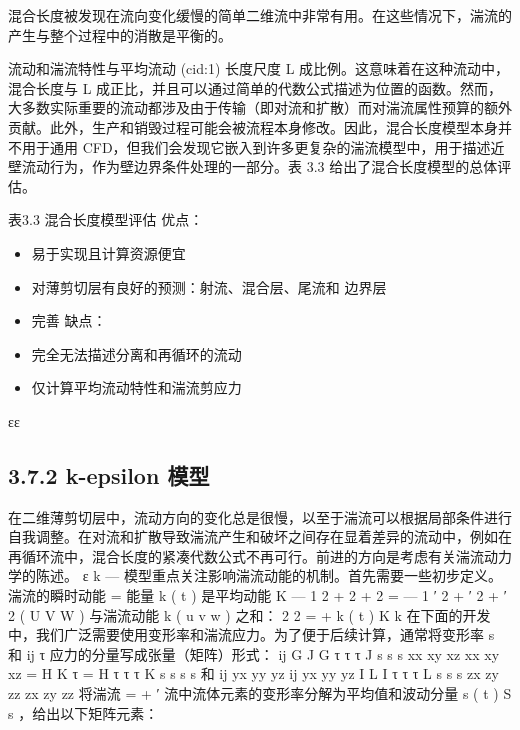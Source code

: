 \documentclass[11pt,a4paper,openany,fontset=none]{ctexbook}
\begin{document}
混合长度被发现在流向变化缓慢的简单二维流中非常有用。在这些情况下，湍流的产生与整个过程中的消散是平衡的。

流动和湍流特性与平均流动 (cid:1) 长度尺度 L 成比例。这意味着在这种流动中，混合长度与 L 成正比，并且可以通过简单的代数公式描述为位置的函数。然而，大多数实际重要的流动都涉及由于传输（即对流和扩散）而对湍流属性预算的额外贡献。此外，生产和销毁过程可能会被流程本身修改。因此，混合长度模型本身并不用于通用 CFD，但我们会发现它嵌入到许多更复杂的湍流模型中，用于描述近壁流动行为，作为壁边界条件处理的一部分。表 3.3 给出了混合长度模型的总体评估。

表3.3 混合长度模型评估
优点：

\begin{itemize}

\item 易于实现且计算资源便宜

\item 对薄剪切层有良好的预测：射流、混合层、尾流和 边界层

\item 完善 缺点：

\item 完全无法描述分离和再循环的流动

\item 仅计算平均流动特性和湍流剪应力

\end{itemize}

εε

\subsection*{3.7.2 k-epsilon 模型}

在二维薄剪切层中，流动方向的变化总是很慢，以至于湍流可以根据局部条件进行自我调整。在对流和扩散导致湍流产生和破坏之间存在显着差异的流动中，例如在再循环流中，混合长度的紧凑代数公式不再可行。前进的方向是考虑有关湍流动力学的陈述。 ε k — 模型重点关注影响湍流动能的机制。首先需要一些初步定义。湍流的瞬时动能 = 能量 k ( t ) 是平均动能 K — 1 2 + 2 + 2 = — 1 ′ 2 + ′ 2 + ′ 2 ( U V W ) 与湍流动能 k ( u v w ) 之和： 2 2 = + k ( t ) K k
在下面的开发中，我们广泛需要使用变形率和湍流应力。为了便于后续计算，通常将变形率 s 和 ij τ 应力的分量写成张量（矩阵）形式： ij G J G τ τ τ J s s s xx xy xz xx xy xz = H K τ = H τ τ τ K s s s s 和 ij yx yy yz ij yx yy yz I L I τ τ τ L s s s zx zy zz zx zy zz 将湍流 = + ′ 流中流体元素的变形率分解为平均值和波动分量 s ( t ) S s ，给出以下矩阵元素：
\end{document}

